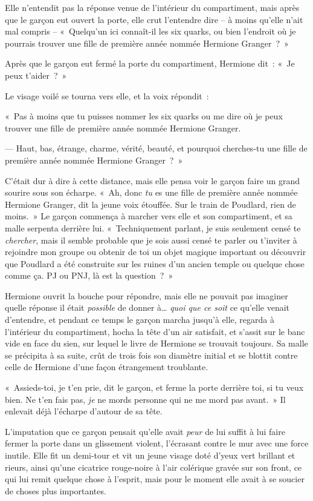 Elle n'entendit pas la réponse venue de l'intérieur du compartiment, mais après que le garçon eut ouvert la porte, elle crut l'entendre dire -- à moins qu'elle n'ait mal compris -- «~Quelqu'un ici connaît-il les six quarks, ou bien l'endroit où je pourrais trouver une fille de première année nommée Hermione Granger~?~»

Après que le garçon eut fermé la porte du compartiment, Hermione dit~: «~Je peux t'aider~?~»

Le visage voilé se tourna vers elle, et la voix répondit~:

«~Pas à moins que tu puisses nommer les six quarks ou me dire où je peux trouver une fille de première année nommée Hermione Granger.

--- Haut, bas, étrange, charme, vérité, beauté, et pourquoi cherches-tu une fille de première année nommée Hermione Granger~?~»

C'était dur à dire à cette distance, mais elle pensa voir le garçon faire un grand sourire sous son écharpe. «~Ah, donc \emph{tu} es une fille de première année nommée Hermione Granger, dit la jeune voix étouffée. Sur le train de Poudlard, rien de moins.~» Le garçon commença à marcher vers elle et son compartiment, et sa malle serpenta derrière lui. «~Techniquement parlant, je suis seulement censé te \emph{chercher}, mais il semble probable que je sois aussi censé te parler ou t'inviter à rejoindre mon groupe ou obtenir de toi un objet magique important ou découvrir que Poudlard a été construite sur les ruines d'un ancien temple ou quelque chose comme ça. PJ ou PNJ, là est la question~?~»

Hermione ouvrit la bouche pour répondre, mais elle ne pouvait pas imaginer quelle réponse il était \emph{possible} de donner à… \emph{quoi que ce soit} ce qu'elle venait d'entendre, et pendant ce temps le garçon marcha jusqu'à elle, regarda à l'intérieur du compartiment, hocha la tête d'un air satisfait, et s'assit sur le banc vide en face du sien, sur lequel le livre de Hermione se trouvait toujours. Sa malle se précipita à sa suite, crût de trois fois son diamètre initial et se blottit contre celle de Hermione d'une façon étrangement troublante.

«~Assieds-toi, je t'en prie, dit le garçon, et ferme la porte derrière toi, si tu veux bien. Ne t'en fais pas, \emph{je} ne mords personne qui ne me mord pas avant.~» Il enlevait déjà l'écharpe d'autour de sa tête.

L'imputation que ce garçon pensait qu'elle avait \emph{peur} de lui suffit à lui faire fermer la porte dans un glissement violent, l'écrasant contre le mur avec une force inutile. Elle fit un demi-tour et vit un jeune visage doté d'yeux vert brillant et rieurs, ainsi qu'une cicatrice rouge-noire à l'air colérique gravée sur son front, ce qui lui remit quelque chose à l'esprit, mais pour le moment elle avait à se soucier de choses plus importantes.

